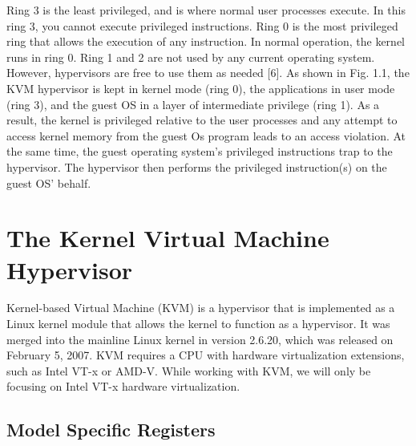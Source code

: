 \documentclass{report}
\begin{document}
\begin{spacing}{1.5}
{\begin{figure}[!h]
\begin{center}
\end{center}
\end{figure}
}

{\large
Ring 3 is the least privileged, and is where normal user processes execute. In this ring 3, you cannot execute privileged instructions. Ring 0 is the most privileged ring that allows the execution of any instruction. In normal operation, the kernel runs in ring 0. Ring 1 and 2 are not used by any current operating system. However, hypervisors are free to use them as needed [6]. As shown in Fig. 1.1, the KVM hypervisor is kept in kernel mode (ring 0), the applications in user mode (ring 3), and the guest OS in a layer of intermediate privilege (ring 1). As a result, the kernel is privileged relative to the user processes and any attempt to access kernel memory from the guest Os program leads to an access violation. At the same time, the guest operating system’s privileged instructions trap to the hypervisor. The hypervisor then performs the privileged instruction(s) on the guest OS' behalf.
\newline
}




\section{The Kernel Virtual Machine Hypervisor}


{\large 
Kernel-based Virtual Machine (KVM) is a hypervisor that is implemented as a Linux kernel module that allows the kernel to function as a hypervisor. It was merged into the mainline Linux kernel in version 2.6.20, which was released on February 5, 2007. KVM requires a CPU with hardware virtualization extensions, such as Intel VT-x or AMD-V. While working with KVM, we will only be focusing on Intel VT-x hardware virtualization.
\newline
}



\subsection{Model Specific Registers}

\end{spacing}
\end{document}
